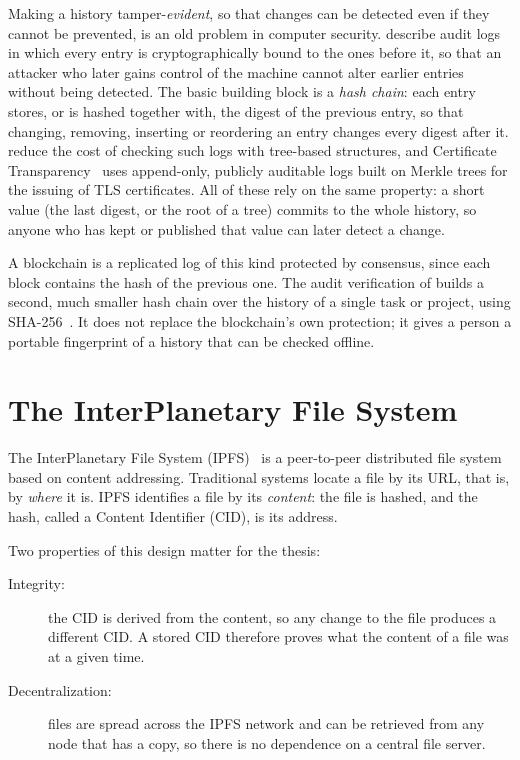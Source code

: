 Making a history tamper-\emph{evident}, so that changes can be detected even if they cannot be prevented, is an old problem in computer security. \textcite{schneier1999secure} describe audit logs in which every entry is cryptographically bound to the ones before it, so that an attacker who later gains control of the machine cannot alter earlier entries without being detected. The basic building block is a \emph{hash chain}: each entry stores, or is hashed together with, the digest of the previous entry, so that changing, removing, inserting or reordering an entry changes every digest after it. \textcite{crosby2009tamper} reduce the cost of checking such logs with tree-based structures, and Certificate Transparency~\cite{rfc6962} uses append-only, publicly auditable logs built on Merkle trees for the issuing of TLS certificates. All of these rely on the same property: a short value (the last digest, or the root of a tree) commits to the whole history, so anyone who has kept or published that value can later detect a change.

A blockchain is a replicated log of this kind protected by consensus, since each block contains the hash of the previous one. The audit verification of  builds a second, much smaller hash chain over the history of a single task or project, using SHA-256~\cite{fips180}. It does not replace the blockchain's own protection; it gives a person a portable fingerprint of a history that can be checked offline.

\section{The InterPlanetary File System}
\label{sec:ipfs}

The InterPlanetary File System (IPFS)~\cite{benet2014ipfs} is a peer-to-peer distributed file system based on content addressing. Traditional systems locate a file by its URL, that is, by \emph{where} it is. IPFS identifies a file by its \emph{content}: the file is hashed, and the hash, called a Content Identifier (CID), is its address.

Two properties of this design matter for the thesis:

\begin{description}
    \item[Integrity:] the CID is derived from the content, so any change to the file produces a different CID. A stored CID therefore proves what the content of a file was at a given time.
    \item[Decentralization:] files are spread across the IPFS network and can be retrieved from any node that has a copy, so there is no dependence on a central file server.
\end{description}

